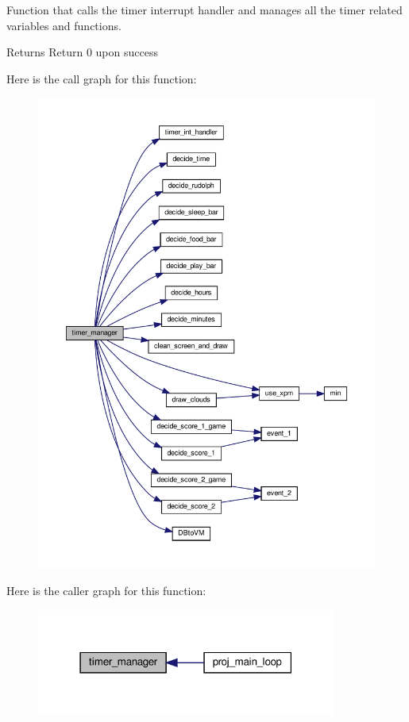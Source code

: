 Function that calls the timer interrupt handler and manages all the timer related variables and functions. 

\begin{DoxyReturn}{Returns}
Return 0 upon success 
\end{DoxyReturn}
Here is the call graph for this function\+:
\nopagebreak
\begin{figure}[H]
\begin{center}
\leavevmode
\includegraphics[width=350pt]{group__main__functions_ga230337632aac7d793969e926a66f0249_cgraph}
\end{center}
\end{figure}
Here is the caller graph for this function\+:
\nopagebreak
\begin{figure}[H]
\begin{center}
\leavevmode
\includegraphics[width=279pt]{group__main__functions_ga230337632aac7d793969e926a66f0249_icgraph}
\end{center}
\end{figure}

